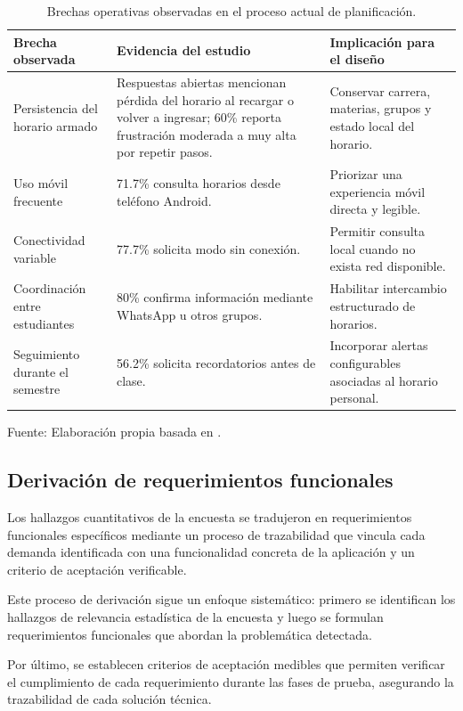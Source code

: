 \begin{table}[H]
\centering
\begin{tabularx}{\linewidth}{p{4.0cm} p{5.6cm} X}
\toprule
Brecha observada & Evidencia del estudio & Implicación para el diseño \\
\midrule
Persistencia del horario armado & Respuestas abiertas mencionan pérdida del horario al recargar o volver a ingresar; 60\% reporta frustración moderada a muy alta por repetir pasos. & Conservar carrera, materias, grupos y estado local del horario. \\
Uso móvil frecuente & 71.7\% consulta horarios desde teléfono Android. & Priorizar una experiencia móvil directa y legible. \\
Conectividad variable & 77.7\% solicita modo sin conexión. & Permitir consulta local cuando no exista red disponible. \\
Coordinación entre estudiantes & 80\% confirma información mediante WhatsApp u otros grupos. & Habilitar intercambio estructurado de horarios. \\
Seguimiento durante el semestre & 56.2\% solicita recordatorios antes de clase. & Incorporar alertas configurables asociadas al horario personal. \\
\bottomrule
\end{tabularx}
\caption{Brechas operativas observadas en el proceso actual de planificación.}\label{tab:brechas_cappuchino}
\small{Fuente: Elaboración propia basada en \cite{encuesta_fcyt_2025}.}
\end{table}

\subsection{Derivación de requerimientos funcionales}

Los hallazgos cuantitativos de la encuesta se tradujeron en requerimientos funcionales específicos mediante un proceso de trazabilidad que vincula cada demanda identificada con una funcionalidad concreta de la aplicación y un criterio de aceptación verificable.

Este proceso de derivación sigue un enfoque sistemático: primero se identifican los hallazgos de relevancia estadística de la encuesta y luego se formulan requerimientos funcionales que abordan la problemática detectada.

Por último, se establecen criterios de aceptación medibles que permiten verificar el cumplimiento de cada requerimiento durante las fases de prueba, asegurando la trazabilidad de cada solución técnica.

